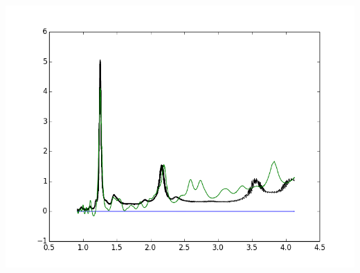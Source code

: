 \documentclass{article}
\begin{document}
\includegraphics{"(6,5) ATPE DNA Paper.png"}
\end{document}
